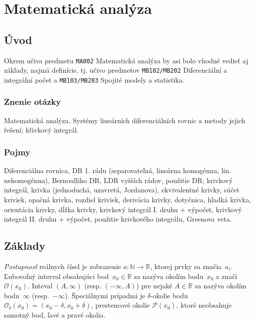 \section{Matematická analýza}

\subsection{Úvod}
Okrem učiva predmetu \verb|MA002| Matematická analýza by asi bolo
vhodné vedieť aj základy, najmä definície, tj. učivo predmetov
\verb|MB102/MB202| Diferenciální a integrální počet a 
\verb|MB103/MB203| Spojité modely a statistika.

\subsubsection*{Znenie otázky}
Matematická analýza. Systémy lineárních diferenciálních rovnic a 
metody jejich řešení; křivkový integrál.

\subsubsection*{Pojmy}
Diferenciálna rovnica, DR 1. rádu (separovateľná, lineárna homogénna,
lin. nehomogénna), Bernoulliho DR, LDR vyšších rádov, použitie DR;
krivkový integrál, krivka (jednoduchá, uzavretá, Jordanova), 
ekvivalentné krivky, súčet kriviek, opačná krivka, rozdiel kriviek,
derivácia krivky, dotyčnica, hladká krivka, orientácia krivky,
dĺžka krivky, krivkový integrál I. druhu + výpočet, krivkový
integrál II. druhu + výpočet, použitie krivkového integrálu,
Greenova veta.

\subsection{Základy}
{\em Postupnosť} reálnych čísel je zobrazenie $a: \mathbb{N} \to \mathbb{R}$,
ktorej prvky sa značia~$a_i$. Ľubovoľný interval obsahujúci 
bod~$x_0 \in \mathbb{R}$ sa nazýva okolím bodu~$x_0$ a značí~$\mathcal{O}(x_0)$.
Inteval $(A, \infty)$ (resp. $(-\infty, A)$) pre nejaké $A \in \mathbb{R}$
sa nazýva okolím bodu~$\infty$ (resp.~$-\infty$). Špeciálnymi prípadmi
je $\delta$-okolie bodu $\mathcal{O}_{\delta}(x_0)=(x_0 - \delta, x_0 + \delta)$,
prestencové okolie $\mathcal{P}(x_0)$, ktoré neobsahuje samotný bod, ľavé a pravé okolia.


